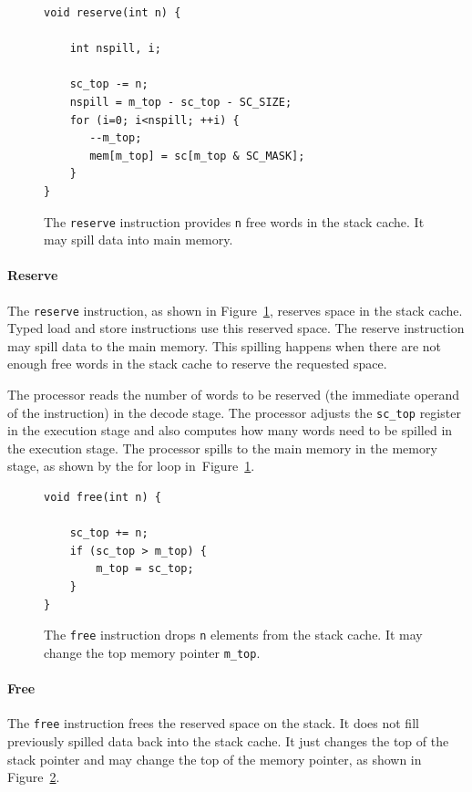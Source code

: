\documentclass[a4paper,fontsize=10pt,twoside,DIV15,BCOR12mm,headinclude=true,footinclude=false,pagesize,bibtotoc]{scrbook}
\newcommand{\code}[1]{{\texttt{#1}}}
\begin{document}
\begin{figure}
\begin{lstlisting}
void reserve(int n) {

    int nspill, i;

    sc_top -= n;
    nspill = m_top - sc_top - SC_SIZE;
    for (i=0; i<nspill; ++i) {
       --m_top;
       mem[m_top] = sc[m_top & SC_MASK];
    }
}
	\end{lstlisting}
 	 \caption{The \code{reserve} instruction provides \code{n}
	 free words in the stack cache. It may spill data into main memory.}
 	 \label{fig:res_iml}
\end{figure}


\paragraph{Reserve} The \code{reserve} instruction, as shown in Figure~\ref{fig:res_iml},
reserves space in the stack cache. Typed load and store instructions use
this reserved space. The reserve instruction may spill data to the
main memory. This spilling happens when there are not enough free words in the
stack cache to reserve the requested space.

The processor reads the number of words to be reserved
(the immediate operand of the instruction) in the decode stage.
The processor adjusts the \code{sc\_top} register in the execution
stage and also computes how many words need to be spilled in the
execution stage. The processor spills to the main memory
in the memory stage, as shown by the for loop in~Figure~\ref{fig:res_iml}.

\begin{figure}
\begin{lstlisting}
void free(int n) {

    sc_top += n;
    if (sc_top > m_top) {
        m_top = sc_top;
    }
}
\end{lstlisting}
	\caption{The \code{free} instruction drops \code{n}
	elements from the stack cache. It may change the top memory
	pointer \code{m\_top}.}
 	 \label{fig:free_iml}
\end{figure}

\paragraph{Free} The \code{free} instruction frees the reserved
space on the stack. It does not fill previously spilled data back into the stack cache.
It just changes the top of the stack pointer and may change the top of the memory
pointer, as shown in Figure~\ref{fig:free_iml}.
\end{document}
